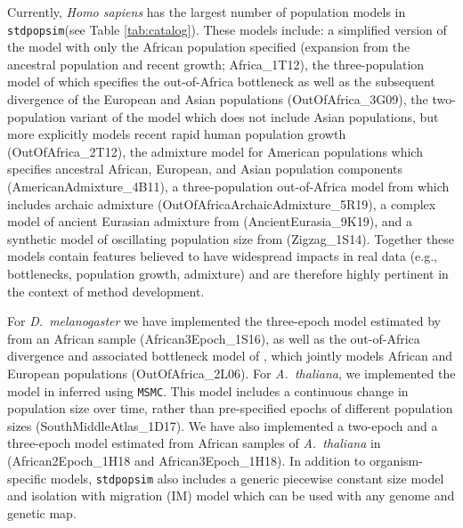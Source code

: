 \documentclass[12pt,halfline,a4paper]{ouparticle}
\newcommand{\stdpopsim}{\texttt{stdpopsim}\xspace}
\newcommand{\MSMC}{\texttt{MSMC}\xspace}
\begin{document}
Currently, {\em Homo sapiens} has the largest number of population models in
\stdpopsim (see Table \ref{tab:catalog}).
These models include: a simplified version of the \cite{tennessen2012evolution}
model with only the African population specified (expansion from the ancestral
population and recent growth; Africa\_1T12), the three-population model of \cite{gutenkunst2009inferring}
which specifies the out-of-Africa bottleneck as well as the subsequent divergence of
the European and Asian populations (OutOfAfrica\_3G09), the \cite{tennessen2012evolution} two-population variant of the
\citeauthor{gutenkunst2009inferring} model which does not include Asian populations, but more explicitly models
recent rapid human population growth (OutOfAfrica\_2T12), the \cite{browning2018ancestry} admixture model
for American populations which specifies ancestral African, European, and Asian population
components (AmericanAdmixture\_4B11), a three-population out-of-Africa model from \cite{ragsdale2019models}
which includes archaic admixture (OutOfAfricaArchaicAdmixture\_5R19),
a complex model of ancient Eurasian admixture from \cite{kamm2019efficiently} (AncientEurasia\_9K19),
and a synthetic model of oscillating population size from \cite{schiffels2014inferring} (Zigzag\_1S14).
Together these models
contain features believed to have widespread impacts in real data (e.g., bottlenecks, population growth,
admixture) and are therefore highly pertinent in the context of method development.

For \textit{D.~melanogaster} we have implemented the three-epoch model estimated by \cite{sheehan2016deep} from
an African sample (African3Epoch\_1S16), as well as the out-of-Africa divergence
and associated bottleneck model of \cite{li2006inferring}, which jointly models African
and European populations (OutOfAfrica\_2L06). For \textit{A.~thaliana}, we implemented the
model in \cite{durvasula2017african} inferred using \MSMC. This model includes
a continuous change in population size over time, rather than pre-specified epochs of different
population sizes (SouthMiddleAtlas\_1D17). We have also implemented a two-epoch and a three-epoch model estimated from African
samples of \textit{A.~thaliana} in \cite{huber2018gene} (African2Epoch\_1H18 and African3Epoch\_1H18).
In addition to organism-specific models, \stdpopsim also includes a generic piecewise constant size model and
isolation with migration (IM) model which can be used with any genome and genetic map.
\end{document}
